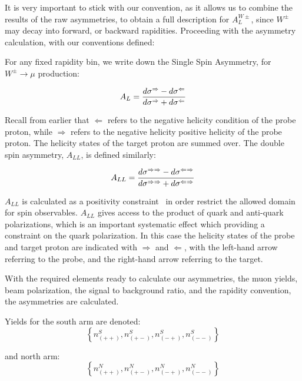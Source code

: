 It is very important to stick with our convention, as it allows us to combine
the results of the raw asymmetries, to obtain a full description for
$A_L^{W\pm}$, since $W^\pm$ may decay into forward, or backward rapidities.
Proceeding with the asymmetry calculation, with our conventions defined:

{\noindent}For any fixed rapidity bin, we write down the Single Spin Asymmetry,
for $W^\pm\rightarrow\mu$ production:

\begin{equation}
  A_L = {
    {d\sigma^{\Rightarrow}-d\sigma^{\Leftarrow}}
    \over
    {d\sigma^{\Rightarrow}+d\sigma^{\Leftarrow}}
  }
\end{equation}

{\noindent}Recall from earlier that $\Leftarrow$ refers to the negative helicity
condition of the probe proton, while $\Rightarrow$ refers to the negative
helicity positive helicity of the probe proton. The helicity states of the
target proton are summed over. The double spin asymmetry, $A_{LL}$, is defined
similarly:

\begin{equation}
  A_{LL} = {
    {d\sigma^{\Rightarrow\Rightarrow}-d\sigma^{\Leftarrow\Rightarrow}}
    \over
    {d\sigma^{\Rightarrow\Rightarrow}+d\sigma^{\Leftarrow\Rightarrow}}
  }
\end{equation}

$A_{LL}$ is calculated as a positivity constraint~\cite{Kang2011} in order
restrict the allowed domain for spin observables. $A_{LL}$ gives access to the
product of quark and anti-quark polarizations, which is an important systematic
effect which providing a constraint on the quark polarization. In this case the
helicity states of the probe and target proton are indicated with $\Rightarrow$
and $\Leftarrow$, with the left-hand arrow referring to the probe, and the
right-hand arrow referring to the target.

With the required elements ready to calculate our asymmetries, the muon yields,
beam polarization, the signal to background ratio, and the rapidity convention,
the asymmetries are calculated. 

{\noindent}Yields for the south arm are denoted:
\begin{equation}
  \left\{
  n_{\left(++\right)}^S,
  n_{\left(+-\right)}^S,
  n_{\left(-+\right)}^S,
  n_{\left(--\right)}^S
  \right\}
  \label{eq:muon_yield_south}
\end{equation}

{\noindent}and north arm:
\begin{equation}
  \left\{
  n_{\left(++\right)}^N,
  n_{\left(+-\right)}^N,
  n_{\left(-+\right)}^N,
  n_{\left(--\right)}^N
  \right\}
  \label{eq:muon_yield_north}
\end{equation}

